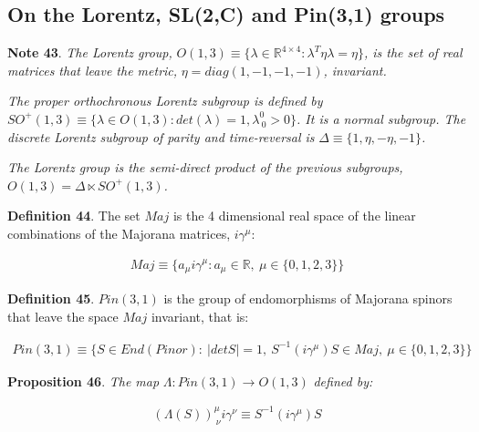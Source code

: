 \documentclass[11pt]{book}
\begin{document}
\hypertarget{on-the-lorentz-sl2c-and-pin31-groups}{%
\subsection{On the Lorentz, SL(2,C) and Pin(3,1)
groups}\label{on-the-lorentz-sl2c-and-pin31-groups}}

\textbf{Note 43}. \emph{The Lorentz group,
}\(O(1,3)\equiv\{\lambda \in \mathbb{R}^{4\times 4}: \lambda^T \eta \lambda=\eta \}\)\emph{,
is the set of real matrices that leave the metric,
}\(\eta=diag(1,-1,-1,-1)\)\emph{, invariant.}

\emph{The proper orthochronous Lorentz subgroup is defined by
}\(SO^+(1,3)\equiv\{\lambda \in
O(1,3): det(\lambda)=1, \lambda^0_{\ 0}>0 \}\)\emph{. It is a normal
subgroup. The discrete Lorentz subgroup of parity and time-reversal is
}\(\Delta \equiv \{1,\eta,-\eta,-1\}\)\emph{.}

\emph{The Lorentz group is the semi-direct product of the previous
subgroups, }\(O(1,3)=\Delta \ltimes SO^+(1,3)\)\emph{.}

\textbf{Definition 44}. The set \(Maj\) is the 4 dimensional real space
of the linear combinations of the Majorana matrices, \(i\gamma^\mu\):

\begin{equation}\begin{aligned}
Maj\equiv\{a_\mu i\gamma^\mu: a_\mu\in \mathbb{R},\ \mu\in\{0,1,2,3\}\}\end{aligned}\end{equation}

\textbf{Definition 45}. \(Pin(3,1)\)
\cite{Berg2001Pin} is the group of
endomorphisms of Majorana spinors that leave the space \(Maj\)
invariant, that is:

\begin{equation}\begin{aligned}
Pin(3,1)\equiv 
\Big\{S\in End(Pinor):\ |det S|=1,\ S^{-1}(i\gamma^\mu)S\in Maj,\ \mu\in\{0,1,2,3\} \Big\}\end{aligned}\end{equation}

\textbf{Proposition 46}. \emph{The map
}\(\Lambda:Pin(3,1)\to O(1,3)\)\emph{ defined by: }

\begin{equation}\begin{aligned}
(\Lambda(S))^\mu_{\ \nu}i\gamma^\nu\equiv S^{-1}(i\gamma^\mu)S\end{aligned}\end{equation}
\end{document}
